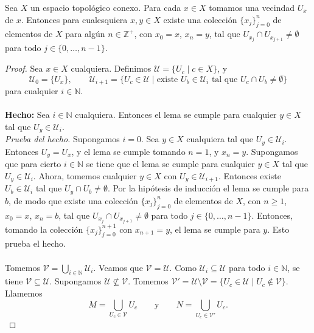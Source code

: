 \begin{Lema}\label{Lema:Lema1}
Sea $X$ un espacio topológico conexo. Para cada $x\in X$ tomamos una vecindad $U_x$ de $x$. Entonces para cualesquiera $x,y\in X$ existe una colección $\{x_j\}_{j=0}^{n}$ de elementos de $X$ para algún $n\in\mathbb{Z}^+$, con $x_0=x$, $x_n=y$, tal que $U_{x_j}\cap U_{x_{j+1}}\neq\emptyset$ para todo $j\in\{0,\dots,n-1\}$.
\end{Lema}
\begin{proof}
    
Sea $x\in X$ cualquiera. Definimos $\mathcal{U}=\{U_c\mid c\in X\}$, y
\[
\mathcal{U}_0=\{U_x\},\qquad
\mathcal{U}_{i+1}=\{U_c\in\mathcal{U}\mid \text{existe } U_b\in\mathcal{U}_i \text{ tal que } U_c\cap U_b\neq\emptyset\}
\]
para cualquier $i\in\mathbb{N}$.\\\\ 
\textbf{Hecho:} Sea $i\in\mathbb{N}$ cualquiera. Entonces el lema se cumple para cualquier $y\in X$ tal que $U_y\in\mathcal{U}_i$.\\ 
\textit{Prueba del hecho.} Supongamos $i=0$. Sea $y\in X$ cualquiera tal que $U_y\in\mathcal{U}_i$. Entonces $U_y=U_x$, y el lema se cumple tomando $n=1$, y $x_n=y$. Supongamos que para cierto $i\in\mathbb{N}$ se tiene que el lema se cumple para cualquier $y\in X$ tal que $U_y\in\mathcal{U}_i$. Ahora, tomemos cualquier $y\in X$ con $U_y\in\mathcal{U}_{i+1}$. Entonces existe $U_b\in\mathcal{U}_i$ tal que $U_y\cap U_b\neq\emptyset$. Por la hipótesis de inducción el lema se cumple para $b$, de modo que existe una colección $\{x_j\}_{j=0}^{n}$ de elementos de $X$, con $n\ge 1$, $x_0=x$, $x_n=b$, tal que $U_{x_j}\cap U_{x_{j+1}}\neq\emptyset$ para todo $j\in\{0,\dots,n-1\}$. Entonces, tomando la colección $\{x_j\}_{j=0}^{n+1}$ con $x_{n+1}=y$, el lema se cumple para $y$. Esto prueba el hecho.\\\\
Tomemos $\mathcal{V}=\bigcup_{i\in\mathbb{N}}\mathcal{U}_i$. Veamos que $\mathcal{V}=\mathcal{U}$. Como $\mathcal{U}_i\subseteq\mathcal{U}$ para todo $i\in\mathbb{N}$, se tiene $\mathcal{V}\subseteq\mathcal{U}$. Supongamos $\mathcal{U}\not\subseteq\mathcal{V}$. Tomemos $\mathcal{V}'=\mathcal{U}\setminus\mathcal{V}=\{U_c\in\mathcal{U}\mid U_c\notin\mathcal{V}\}$. Llamemos
\[
M=\bigcup_{U_c\in\mathcal{V}}U_c
\qquad\text{y}\qquad
N=\bigcup_{U_c\in\mathcal{V}'}U_c .
\]

\end{proof}
